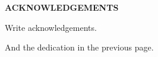 \begin{centering}
\textbf{ACKNOWLEDGEMENTS}\\
\vspace{\baselineskip}
\end{centering}

\begin{todo}[ACK]
    Write acknowledgements.

    And the dedication in the previous page.
\end{todo}

